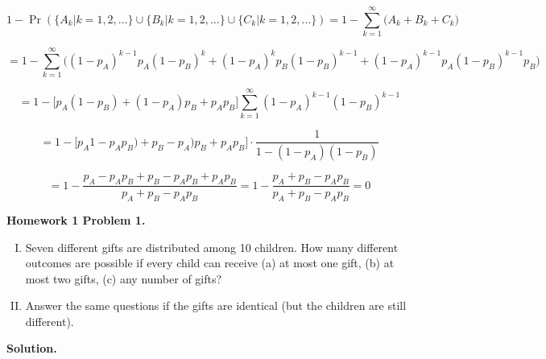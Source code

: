 \begin{enumerate}[(a)]
\[
1 - \Pr(\{A_k | k = 1, 2, \ldots\} \cup \{B_k | k = 1, 2, \ldots\} \cup \{C_k | k = 1, 2, \ldots\}) = 1 - \sum_{k = 1}^\infty \big(A_k + B_k + C_k\big)
\]

\[
= 1 - \sum_{k=1}^\infty \big( (1 - p_A)^{{k-1}}p_A(1 - p_B)^{k} + (1 - p_A)^{{k}}p_B(1 - p_B)^{k-1} + (1 - p_A)^{{k-1}}p_A(1 - p_B)^{k-1}p_B \big)
\]

\[
= 1 -   \big[p_A(1 - p_B) + (1 - p_A)p_B + p_Ap_B \big] \sum_{k=1}^\infty (1 - p_A)^{k-1}(1 - p_B)^{k-1} 
\]

\[
=  1 -  \big[ p_A1 - p_A p_B) + p_B - p_A)p_B + p_Ap_B \big] \cdot \frac{1}{1 - (1 - p_A)(1 - p_B)}
\]

\[
=1 -  \frac{p_A - p_Ap_B + p_B - p_Ap_B + p_Ap_B}{p_A + p_B - p_Ap_B} = 1 -  \frac{p_A + p_B - p_Ap_B}{p_A + p_B - p_Ap_B} = \boxed{0}
\]

\end{enumerate}



\textbf{Homework 1 Problem 1.} 

\begin{enumerate}[(I)]

\item Seven different gifts are distributed among 10 children. How many different outcomes are possible if every child can receive (a) at most one gift, (b) at most two gifts, (c) any number of gifts?

\item Answer the same questions if the gifts are identical (but the children are still different).

\end{enumerate}

\textbf{Solution.} 

